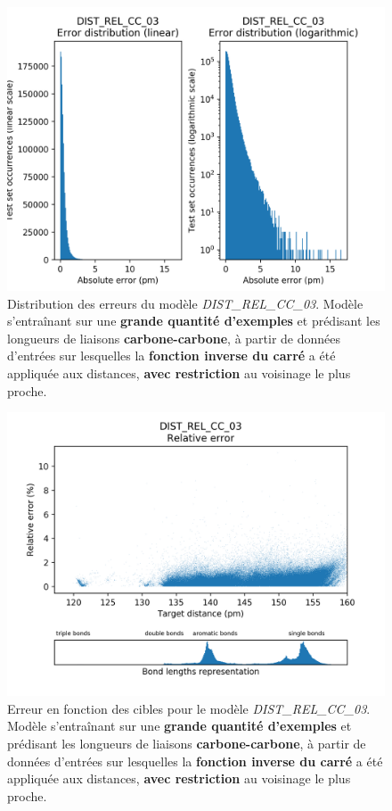 
\begin{figure}[!h]
	\centering
	
	\includegraphics[scale=0.75]{../figures/DIST_REL_CC_03/DIST_REL_CC_03_distrib_rmse_val.png}	
	
	\caption{Distribution des erreurs du modèle \emph{DIST\_REL\_CC\_03}. Modèle s'entraînant sur une \textbf{grande quantité d'exemples} et prédisant les longueurs de liaisons \textbf{carbone-carbone}, à partir de données d'entrées sur lesquelles la \textbf{fonction inverse du carré} a été appliquée aux distances, \textbf{avec restriction} au voisinage le plus proche.}
\end{figure}

\begin{figure}[!h]
	\centering
	
	\includegraphics[scale=0.75]{../figures/DIST_REL_CC_03/DIST_REL_CC_03_distrib_rmse_dist.png}	
	
	\caption{Erreur en fonction des cibles pour le modèle \emph{DIST\_REL\_CC\_03}. Modèle s'entraînant sur une \textbf{grande quantité d'exemples} et prédisant les longueurs de liaisons \textbf{carbone-carbone}, à partir de données d'entrées sur lesquelles la \textbf{fonction inverse du carré} a été appliquée aux distances, \textbf{avec restriction} au voisinage le plus proche.}
\end{figure}

